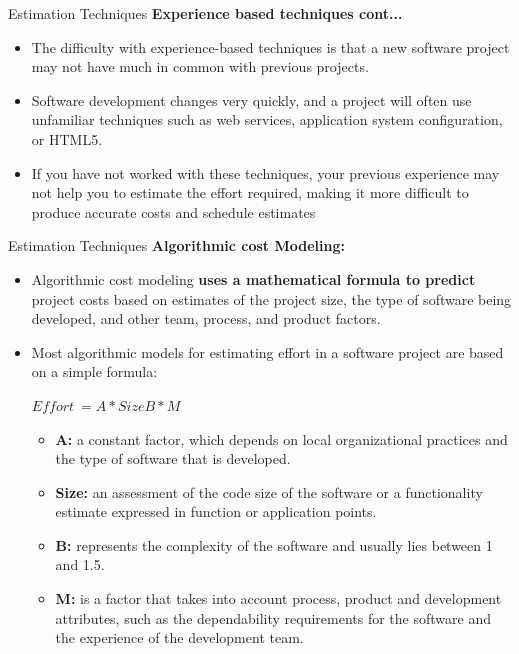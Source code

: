 \documentclass{beamer}
\begin{document}
\begin{frame}{Estimation Techniques}
	\textbf{Experience based techniques cont...}
	\begin{itemize}
		\item The difficulty with experience-based techniques is that a new software project may not have much in 
		common with previous projects. 
		\item Software development changes very quickly, and a project will often 
		use unfamiliar techniques such as web services, application system configuration, or HTML5.
		\item If you 
		have not worked with these techniques, your previous experience may not help you to estimate the 
		effort required, making it more difficult to produce accurate costs and schedule estimates
	\end{itemize}
\end{frame}
\begin{frame}{Estimation Techniques}
	\textbf{Algorithmic cost Modeling:}
	\begin{itemize}
		\item Algorithmic cost modeling \textbf{uses a mathematical formula to predict} project costs based on estimates of 
		the project size, the type of software being developed, and other team, process, and product factors.

		\item Most algorithmic models for estimating effort in a software project are based on a simple formula:
		\begin{center}
			$Effort\  = A * SizeB * M$
		\end{center}
		\begin{itemize}
			\item \textbf{ A:} a constant factor, which depends on local organizational practices and the type of software that 
			is developed.
			\item \textbf{Size:} an assessment of the code size of the software or a functionality estimate expressed in 
			function or application points.

			\item \textbf{B:} represents the complexity of the software and usually lies between 1 and 1.5.
			\item \textbf{M:} is a factor that takes into account process, product and development attributes, such as the 
			dependability requirements for the software and the experience of the development team.
		\end{itemize}
	\end{itemize}
\end{frame}
\end{document}
